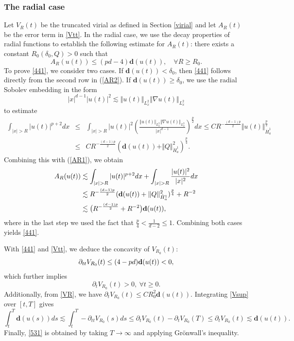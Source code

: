 \documentclass[12pt]{amsart}
\begin{document}
\subsubsection{The radial case}

Let $V_R(t)$ be the truncated virial as defined in Section \ref{virial}  and let $A_R(t)$ be the error term in \eqref{Vtt}. In the radial case, we use the decay properties of radial functions to establish the following estimate for $A_R(t)$: there exists a constant $R_0(\delta_0, Q)>0$ such that 
\begin{equation}
A_{R}(u(t))\leq (pd-4)\mathbf{d}(u(t)), \quad \forall R\ge R_0.  \label{441}
\end{equation}
 To prove \eqref{441}, we consider two cases. If
$\mathbf{d}(u(t))<\delta _{0}$, then \eqref{441} follows directly from the second row in (\ref{AR2}). If $\mathbf{d}(u(t))\geq \delta _{0}$, we use the radial Sobolev embedding in the form 
\begin{equation*}
|x|^{d-1}|u(t)|^{2}\lesssim \Vert u(t)\Vert _{L_x^2}\Vert \nabla u(t)\Vert _{L_x^2}
\end{equation*}%
to estimate 
\begin{eqnarray*}
\int_{|x|>R}|u(t)|^{p+2}dx &\leq &\int_{|x|>R}|u(t)|^{2}\left( \frac{\Vert
u(t)\Vert _{L_x^2}\Vert \nabla u(t)\Vert _{L_x^2}}{|x|^{d-1}}\right) ^{\frac{p}{2}%
}dx\leq CR^{-\frac{(d-1)p}2}\Vert u(t)\Vert _{\dot{H}_{a}^{1}}^{\frac{p}{2}} \\
&\leq &CR^{-\frac{(d-1)p}2}(\mathbf{d}(u(t))+\Vert Q\Vert _{\dot{H}_{a}^{1}}^{2})^{\frac{p%
}{4}}.
\end{eqnarray*}%
Combining this with (\ref{AR1}), we obtain
\begin{align*}
A_{R}(u(t))& \lesssim \int_{|x|>R}|u(t)|^{p+2}dx+\int_{|x|>R}\frac{|u(t)|^{2}%
}{|x|^{2}}dx \\
& \lesssim R^{-\frac{(d-1)p}2}(\mathbf{d}(u(t))+\Vert Q\Vert _{\dot{H}_{a}^{1}}^{2})^{%
\frac{p}{4}}+R^{-2} \\
& \lesssim \bigl(R^{-\frac{(d-1)p}2}+R^{-2}\big)\mathbf{d}(u(t)),
\end{align*}%
where in the last step we used the fact that $\frac{p}{4}<%
\frac{1}{d-2}\leq 1$. Combining both cases yields \eqref{441}.


With \eqref{441} and \eqref{Vtt}, we deduce the concavity of $V_{R_0}(t)$:
\begin{equation}
\partial _{tt}V_{R_0}(t)\leq (4-pd)\mathbf{%
d}(u(t))<0, \label{Vsup}
\end{equation}%
which further implies 
\begin{equation}
\partial _{t}V_{R_0}(t)>0,\ \forall t\geq 0.  \label{Vr mono}
\end{equation}%
Additionally, from \eqref{VR}, we have $\partial_t V_{R_0}(t)\le CR_0^2\mathbf{d}(u(t))$. Integrating \eqref{Vsup} over $[t,T]$ gives
\begin{equation*}
\int_{t}^{T}\mathbf{d}(u(s))ds\lesssim \int_{t}^{T}-\partial
_{tt}V_{R_0}(s)ds\leq \partial _{t}V_{R_0}(t)-\partial _{t}V_{R_0}(T)\leq \partial
_{t}V_{R_0}(t)\lesssim \mathbf{d}(u(t)).
\end{equation*}%
 Finally, \eqref{531} is obtained by taking $T\rightarrow \infty $ and applying Gr\"{o}nwall's inequality.
 
\end{document}
